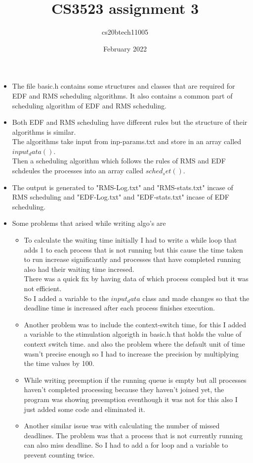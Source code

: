 \documentclass[15pt]{article}
\title{CS3523 assignment 3}
\author{cs20btech11005 }
\date{February 2022}
\begin{document}
\maketitle

\begin{itemize}
\item The file basic.h contains some structures and classes that are required for EDF and RMS scheduling algorithms. It also contains a common part of scheduling algorithm of EDF and RMS scheduling.
\item Both EDF and RMS scheduling have different rules but the structure of their algorithms is similar.\\
The algorithms take input from inp-params.txt and store in an array called $input_data()$.\\
Then a scheduling algorithm which follows the rules of RMS and EDF schdeules the processes into an array called $sched_set()$.
\item The output is generated to "RMS-Log.txt" and "RMS-stats.txt" incase of RMS scheduling and "EDF-Log.txt" and "EDF-stats.txt" incase of EDF scheduling.
\item Some problems that arised while writing algo's are
\begin{itemize}
\item To calculate the waiting time initially I had to write a while loop that adds 1 to each process that is not running but this cause the time taken to run increase significantly and processes that have completed running also had their waiting time incresed.\\
There was a quick fix by having data of which process compled but it was not efficient.\\
So I added a variable to the $input_data$ class and made changes so that the deadline time is increased after each process finishes execution.
\item Another problem was to include the context-switch time, for this I added a variable to the stimulation algorigth in basic.h that holds the value of context switch time. and also the problem where the default unit of time wasn't precise enough so I had to increase the precision by multiplying the time values by 100.
\item While writing preemption if the running queue is empty but all processes haven't completed processing because they haven't joined yet, the program was showing preemption eventhough it was not for this also I just added some code and eliminated it.
\item Another similar issue was with calculating the number of missed deadlines. The problem was that a process that is not currently running can also miss deadline. So I had to add a for loop and a variable to prevent counting twice.
\end{itemize}
\end{itemize}
\end{document}
